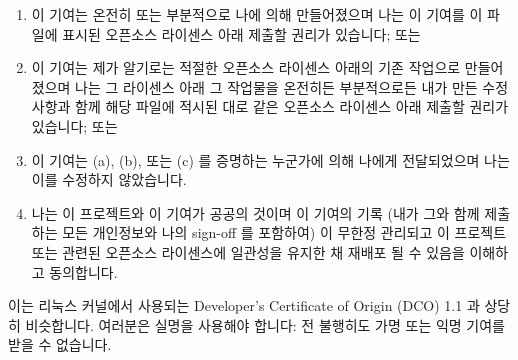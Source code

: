 \begin{enumerate}[label={(\alph*)}]
\item	이 기여는 온전히 또는 부분적으로 나에 의해 만들어졌으며 나는 이 기여를
	이 파일에 표시된 오픈소스 라이센스 아래 제출할 권리가 있습니다; 또는
\item	이 기여는 제가 알기로는 적절한 오픈소스 라이센스 아래의 기존 작업으로
	만들어졌으며 나는 그 라이센스 아래 그 작업물을 온전히든 부분적으로든
	내가 만든 수정사항과 함께 해당 파일에 적시된 대로 같은 오픈소스
	라이센스 아래 제출할 권리가 있습니다; 또는
\item	이 기여는 (a), (b), 또는 (c) 를 증명하는 누군가에 의해 나에게
	전달되었으며 나는 이를 수정하지 않았습니다.
\item	나는 이 프로젝트와 이 기여가 공공의 것이며 이 기여의 기록 (내가 그와
	함께 제출하는 모든 개인정보와 나의 sign-off 를 포함하여) 이 무한정
	관리되고 이 프로젝트 또는 관련된 오픈소스 라이센스에 일관성을 유지한 채
	재배포 될 수 있음을 이해하고 동의합니다.

\iffalse

\item	The contribution was created in whole or in part
	by me and I have the right to submit it under
	the open source license indicated in the file; or
\item	The contribution is based upon previous work
	that, to the best of my knowledge, is covered
	under an appropriate open source License and I
	have the right under that license to submit that
	work with modifications, whether created in whole
	or in part by me, under the same open source
	license (unless I am permitted to submit under
	a different license), as indicated in the file; or
\item	The contribution was provided directly to me by
	some other person who certified (a), (b) or (c)
	and I have not modified it.
\item	I understand and agree that this project and the
	contribution are public and that a record of the
	contribution (including all personal information
	I submit with it, including my sign-off) is
	maintained indefinitely and may be redistributed
	consistent with this project or the open source
	license(s) involved.

\fi

\end{enumerate}

이는 리눅스 커널에서 사용되는 Developer's Certificate of Origin (DCO) 1.1 과
상당히 비슷합니다.
여러분은 실명을 사용해야 합니다:  전 불행히도 가명 또는 익명 기여를 받을 수
없습니다.

